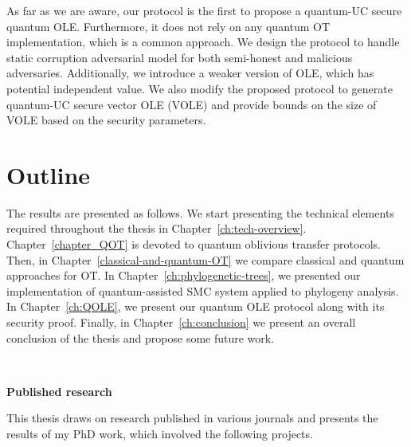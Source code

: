 As far as we are aware, our protocol is the first to propose a quantum-UC secure quantum OLE. Furthermore, it does not rely on any quantum OT implementation, which is a common approach. We design the protocol to handle static corruption adversarial model for both semi-honest and malicious adversaries. Additionally, we introduce a weaker version of OLE, which has potential independent value. We also modify the proposed protocol to generate quantum-UC secure vector OLE (VOLE) and provide bounds on the size of VOLE based on the security parameters.

\section*{Outline}

The results are presented as follows. We start presenting the technical elements required throughout the thesis in Chapter~\ref{ch:tech-overview}. Chapter~\ref{chapter_QOT} is devoted to quantum oblivious transfer protocols. Then, in Chapter~\ref{classical-and-quantum-OT} we compare classical and quantum approaches for OT. In Chapter~\ref{ch:phylogenetic-trees}, we presented our implementation of quantum-assisted SMC system applied to phylogeny analysis. In Chapter~\ref{ch:QOLE}, we present our quantum OLE protocol along with its security proof. Finally, in Chapter~\ref{ch:conclusion} we present an overall conclusion of the thesis and propose some future work.


\

\noindent\textbf{Published research}

\noindent This thesis draws on research published in various journals and presents the results of my PhD work, which involved the following projects.

